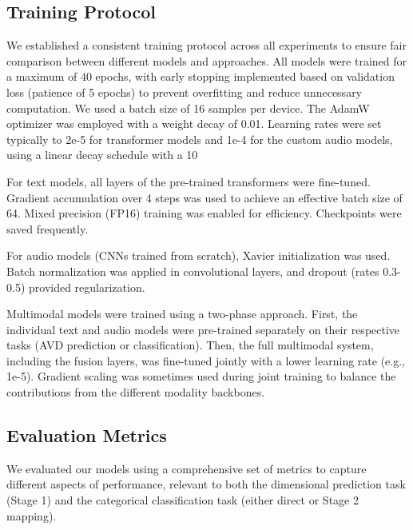 \documentclass[12pt]{article}
\begin{document}
\subsection{Training Protocol}
We established a consistent training protocol across all experiments to ensure fair comparison between different models and approaches. All models were trained for a maximum of 40 epochs, with early stopping implemented based on validation loss (patience of 5 epochs) to prevent overfitting and reduce unnecessary computation. We used a batch size of 16 samples per device. The AdamW optimizer was employed with a weight decay of 0.01. Learning rates were set typically to 2e-5 for transformer models and 1e-4 for the custom audio models, using a linear decay schedule with a 10%

For text models, all layers of the pre-trained transformers were fine-tuned. Gradient accumulation over 4 steps was used to achieve an effective batch size of 64. Mixed precision (FP16) training was enabled for efficiency. Checkpoints were saved frequently.

For audio models (CNNs trained from scratch), Xavier initialization was used. Batch normalization was applied in convolutional layers, and dropout (rates 0.3-0.5) provided regularization.

Multimodal models were trained using a two-phase approach. First, the individual text and audio models were pre-trained separately on their respective tasks (AVD prediction or classification). Then, the full multimodal system, including the fusion layers, was fine-tuned jointly with a lower learning rate (e.g., 1e-5). Gradient scaling was sometimes used during joint training to balance the contributions from the different modality backbones.

\subsection{Evaluation Metrics}
We evaluated our models using a comprehensive set of metrics to capture different aspects of performance, relevant to both the dimensional prediction task (Stage 1) and the categorical classification task (either direct or Stage 2 mapping).
\end{document}

